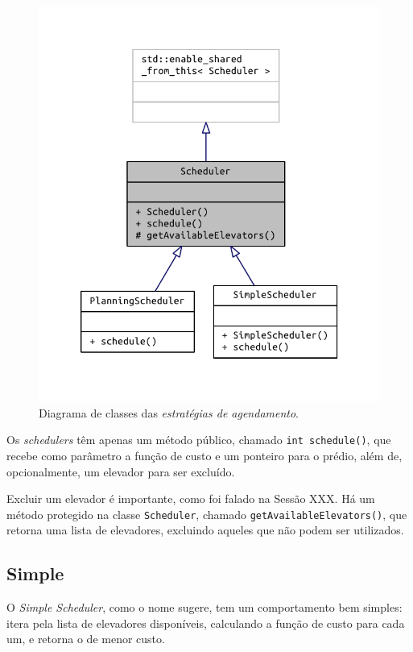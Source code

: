 \begin{figure}[htb]
  \centering
  \includegraphics{doc/latex/class_scheduler__inherit__graph}
  \caption{Diagrama de classes das \textit{estratégias de agendamento}.}
  \label{fig:model:schedulers:uml:base}
\end{figure}

Os \textit{schedulers} têm apenas um método público, chamado \texttt{int
 schedule()}, que recebe como parâmetro a função de custo e um ponteiro para o
prédio, além de, opcionalmente, um elevador para ser excluído.

Excluir um elevador é importante, como foi falado na Sessão XXX. Há um método
protegido na classe \texttt{Scheduler}, chamado
\texttt{getAvailableElevators()}, que retorna uma lista de elevadores, excluindo
aqueles que não podem ser utilizados.

\subsection{\label{model:schedulers:simple}Simple}
O \textit{Simple Scheduler}, como o nome sugere, tem um comportamento bem
simples: itera pela lista de elevadores disponíveis, calculando a função de
custo para cada um, e retorna o de menor custo.

